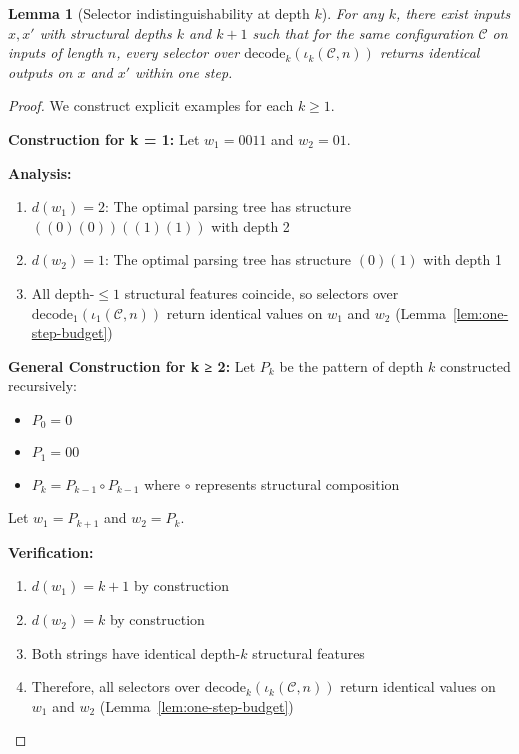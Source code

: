 \documentclass[11pt]{article}
\newtheorem{lemma}{Lemma}
\begin{document}
\begin{lemma}[Selector indistinguishability at depth $k$]
For any $k$, there exist inputs $x,x'$ with structural depths $k$ and $k{+}1$ such that for the same configuration $\mathcal{C}$ on inputs of length $n$, every selector over $\mathrm{decode}_k(\iota_k(\mathcal{C},n))$ returns identical outputs on $x$ and $x'$ within one step.
\end{lemma}

\begin{proof}
We construct explicit examples for each $k \geq 1$.

\textbf{Construction for k = 1:}
Let $w_1 = 0011$ and $w_2 = 01$.

\textbf{Analysis:}
\begin{enumerate}
\item $d(w_1) = 2$: The optimal parsing tree has structure $((0)(0))((1)(1))$ with depth 2
\item $d(w_2) = 1$: The optimal parsing tree has structure $(0)(1)$ with depth 1
\item All depth-$\le 1$ structural features coincide, so selectors over $\mathrm{decode}_1(\iota_1(\mathcal{C},n))$ return identical values on $w_1$ and $w_2$ (Lemma~\ref{lem:one-step-budget})
\end{enumerate}

\textbf{General Construction for k ≥ 2:}
Let $P_k$ be the pattern of depth $k$ constructed recursively:
\begin{itemize}
\item $P_0 = 0$
\item $P_1 = 00$
\item $P_k = P_{k-1} \circ P_{k-1}$ where $\circ$ represents structural composition
\end{itemize}

Let $w_1 = P_{k+1}$ and $w_2 = P_k$.

\textbf{Verification:}
\begin{enumerate}
\item $d(w_1) = k+1$ by construction
\item $d(w_2) = k$ by construction
\item Both strings have identical depth-$k$ structural features
\item Therefore, all selectors over $\mathrm{decode}_k(\iota_k(\mathcal{C},n))$ return identical values on $w_1$ and $w_2$ (Lemma~\ref{lem:one-step-budget})
\end{enumerate}
\end{proof}
\end{document}
